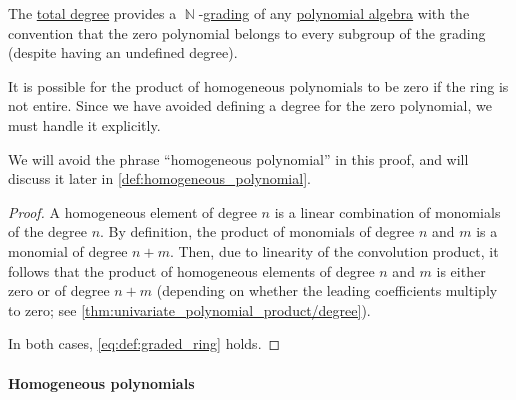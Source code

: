 \begin{proposition}\label{thm:polynomial_algebra_grading}
  The \hyperref[def:polynomial_degree]{total degree} provides a \( \BbbN \)-\hyperref[def:graded_ring]{grading} of any \hyperref[def:polynomial_algebra]{polynomial algebra} with the convention that the zero polynomial belongs to every subgroup of the grading (despite having an undefined degree).
\end{proposition}
\begin{comments}
  \item It is possible for the product of homogeneous polynomials to be zero if the ring is not entire. Since we have avoided defining a degree for the zero polynomial, we must handle it explicitly.

  \item We will avoid the phrase \enquote{homogeneous polynomial} in this proof, and will discuss it later in \cref{def:homogeneous_polynomial}.
\end{comments}
\begin{proof}
  A homogeneous element of degree \( n \) is a linear combination of monomials of the degree \( n \). By definition, the product of monomials of degree \( n \) and \( m \) is a monomial of degree \( n + m \). Then, due to linearity of the convolution product, it follows that the product of homogeneous elements of degree \( n \) and \( m \) is either zero or of degree \( n + m \) (depending on whether the leading coefficients multiply to zero; see \cref{thm:univariate_polynomial_product/degree}).

  In both cases, \eqref{eq:def:graded_ring} holds.
\end{proof}

\paragraph{Homogeneous polynomials}

